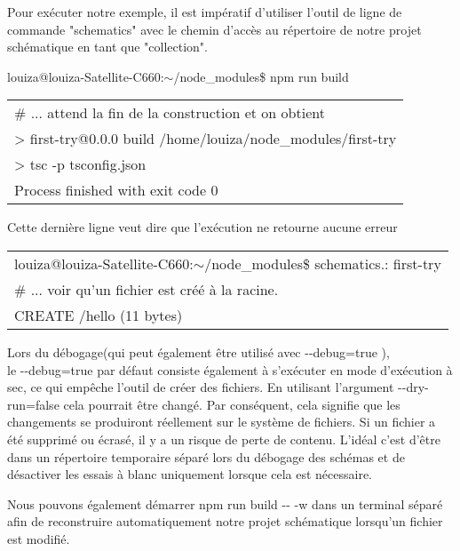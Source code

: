 \documentclass[12pt,french]{article}
\begin{document}
	Pour exécuter notre exemple, il est impératif d'utiliser l'outil de ligne de commande "schematics" avec le chemin d'accès au répertoire de notre projet \\schématique en tant que "collection".\newline  
	
	louiza@louiza-Satellite-C660:$\sim$/node\_modules\$ npm run build \newline
	
	\begin{tabular}{l}
		\# ... attend la fin de la construction et on obtient\\ 
		\qquad > first-try@0.0.0 build /home/louiza/node\_modules/first-try\\
		\qquad > tsc -p tsconfig.json
\\
		Process finished with exit code 0
	\end{tabular}\break

	Cette dernière ligne veut dire que l’exécution ne retourne aucune erreur\newline
	
	\begin{tabular}{l}
		louiza@louiza-Satellite-C660:$\sim$/node\_modules\$ schematics.: first-try \\
		\# ... voir qu'un fichier est créé à la racine. 
\\
		CREATE /hello (11 bytes)
	\end{tabular}\break

	Lors du débogage(qui peut également être utilisé avec \--\--debug=true ),\\ le \--\--debug=true par défaut consiste également à s'exécuter en mode d'exécution à sec, ce qui empêche l'outil de créer des fichiers.\newline
	En utilisant l'argument \--\--dry-run=false cela pourrait être changé. Par conséquent, cela signifie que les changements se produiront réellement sur le système de fichiers. Si un fichier a été supprimé ou écrasé, il y a un risque de perte de contenu. L'idéal c'est d’être dans un répertoire temporaire séparé lors du débogage des schémas et de désactiver les essais à blanc uniquement lorsque cela est nécessaire.\newline
	
	Nous pouvons également démarrer npm run build \--\-- -w dans un terminal séparé afin de reconstruire automatiquement notre projet schématique lorsqu'un fichier est modifié.\newline
	
\end{document}
